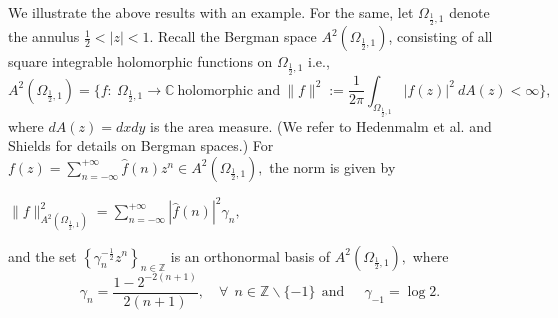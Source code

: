 \documentclass[12pt, reqno]{amsart}
\theoremstyle{definition}
\theoremstyle{remark}
\numberwithin{equation}{section}
\begin{document}
     We illustrate the above results with an example. For the same, let $\Omega_{\frac{1}{2},1}$ denote the annulus $\frac{1}{2}<|z|<1$. Recall the  Bergman space $A^{2}(\Omega_{\frac{1}{2},1})$, consisting of all square integrable holomorphic functions on $\Omega_{\frac{1}{2},1}$ i.e.,
 \[
A^{2}(\Omega_{\frac{1}{2},1})=\{f:~\Omega_{\frac{1}{2},1}\to \mathbb{C}~\text{holomorphic and} ~\lVert f \rVert^{2}:=\frac{1}{2\pi}\int_{\Omega_{\frac{1}{2},1}}|f(z)|^{2}~dA(z)<\infty\},
 \]
 where $dA(z)=dxdy$ is the area measure. (We refer to Hedenmalm et al. \cite{Zhu} and Shields \cite{Shields} for details on Bergman spaces.) For $f(z)=\sum_{n=-\infty}^{+\infty}\widehat{f}(n)z^{n}\in A^{2}(\Omega_{\frac{1}{2},1}),$ the norm is given by 
 \begin{center}
 $\lVert f\rVert^{2}_{A^{2}(\Omega_{\frac{1}{2},1})}=\sum_{n=-\infty}^{+\infty}|\widehat{f}(n)|^{2}\gamma_{n},$
 \end{center}
 and the set $\left\{ \gamma_{n}^{-\frac{1}{2}}z^{n}\right\}_{n\in\mathbb{Z}}$ is an orthonormal basis of $A^{2}(\Omega_{\frac{1}{2},1}),$ where 
\[
\gamma_{n}=\frac{1-2^{-2(n+1)}}{2(n+1)},\quad \forall~~ n\in\mathbb{Z}\backslash\{-1\}~~\text{and}~~\quad \gamma_{-1}=\log 2.
\]
 
\end{document}
